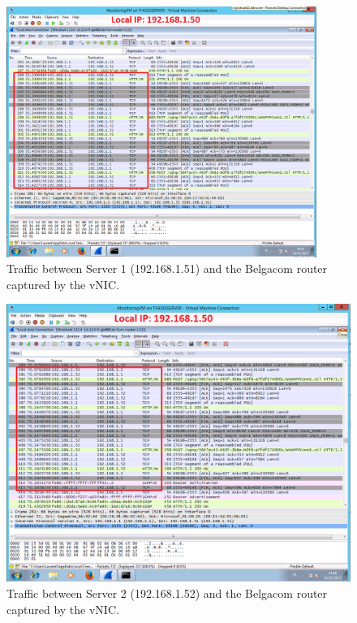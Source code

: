 \documentclass[11pt, a4paper]{article}
\begin{document}
\begin{figure}[h]
    \centering
    \includegraphics[width=0.9\textwidth]{HyperV_6.png}
   \caption{Traffic between Server 1 (192.168.1.51) and the Belgacom router captured by the vNIC.}
\end{figure}
\clearpage
\begin{figure}[h]
    \centering
    \includegraphics[width=1\textwidth]{HyperV_7.png}
   \caption{Traffic between Server 2 (192.168.1.52) and the Belgacom router captured by the vNIC.}
\end{figure}
\clearpage
\end{document}
